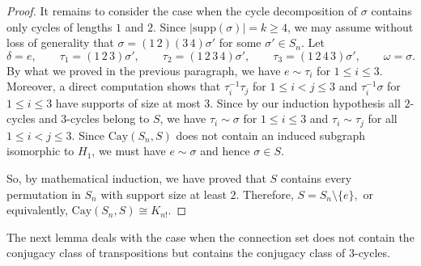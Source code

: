 \documentclass[12pt, a4paper]{article}
\theoremstyle{definition}
\begin{document}
\begin{proof}
It remains to consider the case when the cycle decomposition of $\sigma$ contains only cycles of lengths $1$ and $2$. Since $|\mathrm{supp}(\sigma)| = k \ge 4$, we may assume without loss of generality that
\(
\sigma=(1\,2)(3\,4)\sigma'
\)
for some $\sigma' \in S_n$. Let
\[
\delta=e,\qquad
\tau_1=(1\,2\,3)\sigma',\qquad
\tau_2=(1\,2\,3\,4)\sigma',\qquad
\tau_3=(1\,2\,4\,3)\sigma',\qquad
\omega=\sigma.
\]
By what we proved in the previous paragraph, we have $e\sim\tau_i$ for $1\le i\le 3$. Moreover, a direct computation shows that $\tau_i^{-1}\tau_j$ for $1\le i<j\le 3$ and $\tau_i^{-1}\sigma$ for $1\le i\le 3$ have supports of size at most $3$. Since by our induction hypothesis all $2$-cycles and $3$-cycles belong to $S$, we have $\tau_i \sim \sigma$ for $1\le i\le 3$ and $\tau_i\sim\tau_j$ for all $1\le i<j\le 3$. Since $\mathrm{Cay}(S_n,S)$ does not contain an induced subgraph isomorphic to $H_1$, we must have $e\sim\sigma$ and hence $\sigma\in S$.

So, by mathematical induction, we have proved that $S$ contains every permutation in $S_n$ with support size at least $2$. Therefore,
\(
S=S_n\setminus\{e\}, 
\)
or equivalently,
\(
\mathrm{Cay}(S_n,S) \cong K_{n!}.
\)
\end{proof}

The next lemma deals with the case when the connection set does not contain the conjugacy class of transpositions but contains the conjugacy class of $3$-cycles.
\end{document}
